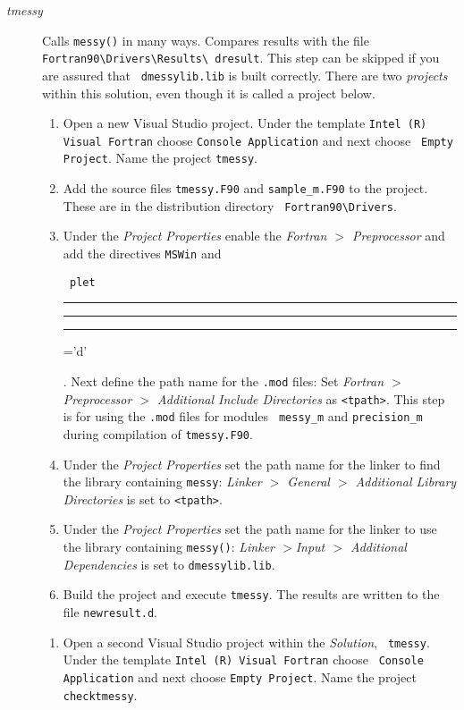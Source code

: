 \documentclass[12pt]{article}
\DeclareRobustCommand{\us}{\rule{.2pt}{0pt}\rule[-.8pt]{.4em}{.5pt}%
  \rule{.2pt}{0pt}}
\DeclareRobustCommand{\us}{\rule{.2pt}{0pt}\rule[-.8pt]{.4em}{.5pt}%
  \rule{.2pt}{0pt}}
\begin{document}
\begin{description}
\item[{\em tmessy}] Calls {\tt messy()} in many ways.  Compares results with the
  file\\{\tt Fortran90\textbackslash Drivers\textbackslash Results\textbackslash
    dresult}.  This step can be skipped if you are assured that {\tt
    dmessylib.lib} is built correctly.  There are two {\it projects} within this
  solution, even though it is called a project below.
  \begin{enumerate}
  \item Open a new Visual Studio project.  Under the template {\tt Intel (R)
      Visual Fortran} choose {\tt Console Application} and next choose {\tt
      Empty Project}.  Name the project {\tt tmessy}.
  \item Add the source files {\tt tmessy.F90} and {\tt sample\_m.F90} to the
    project.  These are in the distribution directory {\tt
      Fortran90\textbackslash Drivers}.
  \item Under the {\em Project Properties} enable the {\em Fortran $>$
      Preprocessor} and add the directives {\tt MSWin} and {\tt
      plet\us=\rq{}d\rq{}}.  Next define the path name for the {\tt .mod} files:
    Set {\em Fortran $>$ Preprocessor $>$ Additional Include Directories} as
    {\tt <tpath>}.  This step is for using the {\tt .mod} files for modules {\tt
      messy\_m} and {\tt precision\_m} during compilation of {\tt tmessy.F90}.

  \item Under the {\em Project Properties} set the path name for the linker to
    find the library containing {\tt messy}: {\em Linker $>$ General $>$
      Additional Library Directories} is set to {\tt <tpath>}.

  \item Under the {\em Project Properties} set the path name for the linker to
    use the library containing {\tt messy()}: {\em Linker $>$Input $>$
      Additional Dependencies} is set to {\tt dmessylib.lib}.
  \item Build the project and execute {\tt tmessy}.  The results are written to
    the file {\tt newresult.d}.
  \end {enumerate}

  \begin{enumerate}
  \item Open a second Visual Studio project within the {\em Solution}, {\tt
      tmessy}.  Under the template {\tt Intel (R) Visual Fortran} choose {\tt
      Console Application} and next choose {\tt Empty Project}.  Name the
    project {\tt checktmessy}.


\end{enumerate}
\end{description}
\end{document}
